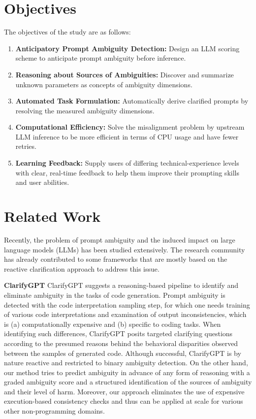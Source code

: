\documentclass[conference]{IEEEtran}
\begin{document}
\section{Objectives}
The objectives of the study are as follows:
\begin{enumerate}
    \item \textbf{Anticipatory Prompt Ambiguity Detection:} Design an LLM scoring scheme to anticipate prompt ambiguity before inference.
    \item \textbf{Reasoning about Sources of Ambiguities:} Discover and summarize unknown parameters as concepts of ambiguity dimensions.
    \item \textbf{Automated Task Formulation:} Automatically derive clarified prompts by resolving the measured ambiguity dimensions.
    \item \textbf{Computational Efficiency:} Solve the misalignment problem by upstream LLM inference to be more efficient in terms of CPU usage and have fewer retries.
    \item \textbf{Learning Feedback:} Supply users of differing technical-experience levels with clear, real-time feedback to help them improve their prompting skills and user abilities.
\end{enumerate}

\section{Related Work}
Recently, the problem of prompt ambiguity and the induced impact on large language models (LLMs) has been studied extensively. The research community has already contributed to some frameworks that are mostly based on the reactive clarification approach to address this issue.

\textbf{ClarifyGPT} \parencite{mu2023clarifygptempoweringllmbasedcode}
ClarifyGPT suggests a reasoning-based pipeline to identify and eliminate ambiguity in the tasks of code generation. Prompt ambiguity is detected with the code interpretation sampling step, for which one needs training of various code interpretations and examination of output inconsistencies, which is (a) computationally expensive and (b) specific to coding tasks. When identifying such differences, ClarifyGPT posits targeted clarifying questions according to the presumed reasons behind the behavioral disparities observed between the samples of generated code. Although successful, ClarifyGPT is by nature reactive and restricted to binary ambiguity detection. On the other hand, our method tries to predict ambiguity in advance of any form of reasoning with a graded ambiguity score and a structured identification of the sources of ambiguity and their level of harm. Moreover, our approach eliminates the use of expensive execution-based consistency checks and thus can be applied at scale for various other non-programming domains.
\end{document}
